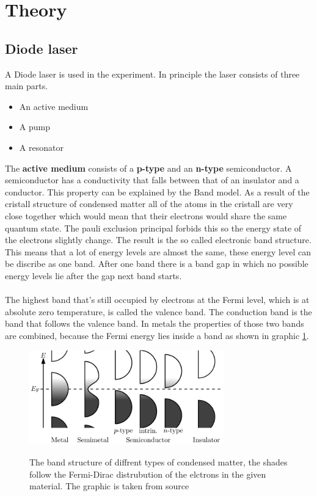 \section{Theory}
\label{sec:Theorie}

\subsection{Diode laser}

A Diode laser is used in the experiment.
In principle the laser consists of three main parts.
\begin{itemize}
    \item An active medium
    \item A pump
    \item A resonator
\end{itemize}
The \textbf{active medium} consists of a \textbf{p-type} and an \textbf{n-type} semiconductor.
A semiconductor has a conductivity that falls between that of an insulator and a conductor.
This property can be explained by the Band model. 
As a result of the cristall structure of condensed matter all of the atoms in the cristall are very close together which would mean that their electrons would share the same quantum state.
The pauli exclusion principal forbids this so the energy state of the electrons slightly change.
The result is the so called electronic band structure.
This means that a lot of energy levels are almost the same, these energy level can be discribe as one band.
After one band there is a band gap in which no possible energy levels lie after the gap next band starts.
\\\\
The highest band that's still occupied by electrons at the Fermi level, which is at absolute zero temperature, is called the valence band.
The conduction band is the band that follows the valence band.
In metals the properties of those two bands are combined, because the Fermi energy lies inside a band as shown in graphic \ref{fig:band_structure}.

\begin{figure}
    \centering
    \caption{The band structure of diffrent types of condensed matter, the shades follow the Fermi-Dirac distrubution of the elctrons in the given material. The graphic is taken from source \cite{wikipedia_valence_conduction_band}}
    \includegraphics[width=0.75\textwidth]{content/data/Band_structure_diffrent_materials}
    \label{fig:band_structure}
\end{figure}

